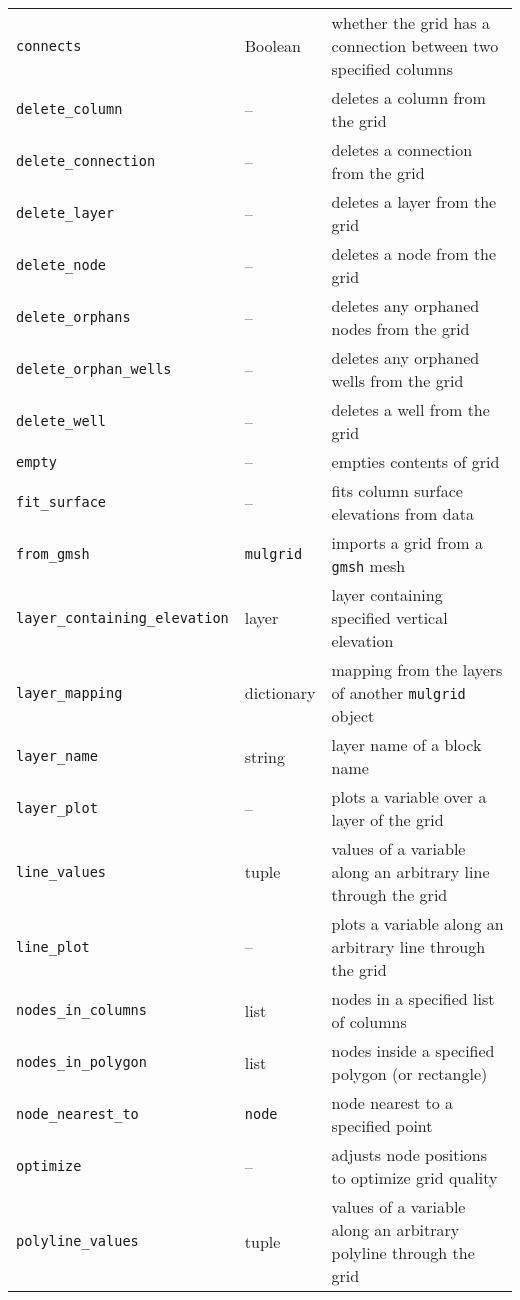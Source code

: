 \begin{center}
\begin{longtable}{|l|l|p{70mm}|}
  \texttt{connects} & Boolean & whether the grid has a connection between two specified columns\\ 
  \texttt{delete\_column} & -- & deletes a column from the grid\\ 
  \texttt{delete\_connection} & -- & deletes a connection from the grid\\ 
  \texttt{delete\_layer} & -- & deletes a layer from the grid\\ 
  \texttt{delete\_node} & -- & deletes a node from the grid\\ 
  \texttt{delete\_orphans} & -- & deletes any orphaned nodes from the grid\\ 
  \texttt{delete\_orphan\_wells} & -- & deletes any orphaned wells from the grid\\ 
  \texttt{delete\_well} & -- & deletes a well from the grid\\ 
  \texttt{empty} & --  & empties contents of grid\\
  \texttt{fit\_surface} & -- & fits column surface elevations from data\\ 
  \texttt{from\_gmsh} & \texttt{mulgrid} & imports a grid from a \texttt{gmsh} mesh\\ 
  \texttt{layer\_containing\_elevation} & layer & layer containing specified vertical elevation\\
  \texttt{layer\_mapping} & dictionary & mapping from the layers of another \texttt{mulgrid} object\\
  \texttt{layer\_name} & string & layer name of a block name\\ 
  \texttt{layer\_plot} & -- & plots a variable over a layer of the grid\\
  \texttt{line\_values} & tuple & values of a variable along an arbitrary line through the grid\\
  \texttt{line\_plot} & -- & plots a variable along an arbitrary line through the grid\\
  \texttt{nodes\_in\_columns} & list & nodes in a specified list of columns\\ 
  \texttt{nodes\_in\_polygon} & list & nodes inside a specified polygon (or rectangle)\\ 
  \texttt{node\_nearest\_to} & \texttt{node} & node nearest to a specified point\\ 
  \texttt{optimize} & -- & adjusts node positions to optimize grid quality\\
  \texttt{polyline\_values} & tuple & values of a variable along an arbitrary polyline through the grid\\

\end{longtable}
\end{center}
